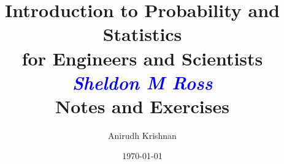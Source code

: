 \documentclass[letterpaper,12pt]{report}
\begin{document}
\author{Anirudh Krishnan}
\title{Introduction to Probability and Statistics \\ for Engineers and Scientists \\ \textit{\textcolor{blue}{Sheldon M Ross}} \\ Notes and Exercises}
\date{\today}

\maketitle
\tableofcontents

%
%
%
%
%
%
%
%
%
%
%
%

%

\end{document}

